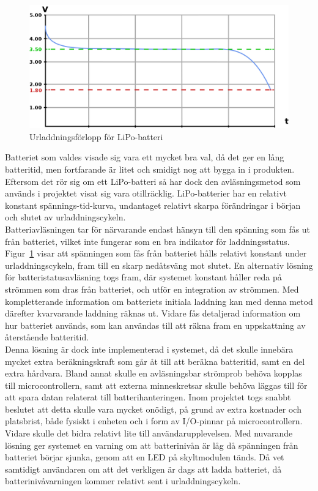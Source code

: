 \documentclass[a4paper,11pt]{article}
\begin{document}
\begin{figure}[H]
\begin{center}
\includegraphics[scale=0.35, angle=0]{battery.png}
\end{center}
\caption{Urladdningsförlopp för LiPo-batteri}
\label{fig:batterygraph}
\end{figure}

Batteriet som valdes visade sig vara ett mycket bra val, då det ger en lång batteritid, men fortfarande är litet och smidigt nog att bygga in i produkten. Eftersom det rör sig om ett LiPo-batteri så har dock den avläsningsmetod som används i projektet visat sig vara otillräcklig. LiPo-batterier har en relativt konstant spännings-tid-kurva, undantaget relativt skarpa förändringar i början och slutet av urladdningscykeln. \\

Batteriavläsningen tar för närvarande endast hänsyn till den spänning som fås ut från batteriet, vilket inte fungerar som en bra indikator för laddningsstatus. Figur~\ref{fig:batterygraph} visar att spänningen som fås från batteriet hålls relativt konstant under urladdningscykeln, fram till en skarp nedåtsväng mot slutet. En alternativ lösning för batteristatusavläsning togs fram, där systemet konstant håller reda på strömmen som dras från batteriet, och utför en integration av strömmen. Med kompletterande information om batteriets initiala laddning kan med denna metod därefter kvarvarande laddning räknas ut. Vidare fås detaljerad information om hur batteriet används, som kan användas till att räkna fram en uppskattning av återstående batteritid. \\

Denna lösning är dock inte implementerad i systemet, då det skulle innebära mycket extra beräkningskraft som går åt till att beräkna batteritid, samt en del extra hårdvara. Bland annat skulle en avläsningsbar strömprob behöva kopplas till microcontrollern, samt att externa minneskretsar skulle behöva läggas till för att spara datan relaterat till batterihanteringen. Inom projektet togs snabbt beslutet att detta skulle vara mycket onödigt, på grund av extra kostnader och platsbrist, både fysiskt i enheten och i form av I/O-pinnar på microcontrollern. Vidare skulle det bidra relativt lite till användarupplevelsen. Med nuvarande lösning ger systemet en varning om att batterinivån är låg då spänningen från batteriet börjar sjunka, genom att en LED på skyltmodulen tänds. Då vet samtidigt användaren om att det verkligen är dags att ladda batteriet, då batterinivåvarningen kommer relativt sent i urladdningscykeln. \\
\end{document}

